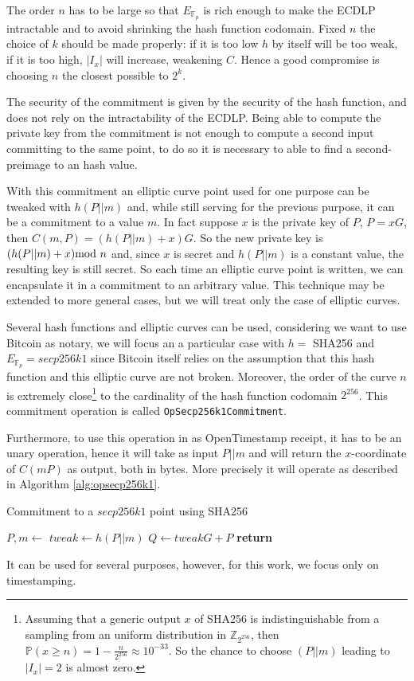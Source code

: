 The order $n$ has to be large so that $E_{\mathbb{F}_p}$ is rich enough to make the ECDLP intractable and to avoid shrinking the hash function codomain. Fixed $n$ the choice of $k$ should be made properly: if it is too low $h$ by itself will be too weak, if it is too high, $|I_x|$ will increase, weakening $C$. Hence a good compromise is choosing $n$ the closest possible to $2^k$.

The security of the commitment is given by the security of the hash function, and does not rely on the intractability of the ECDLP. Being able to compute the private key from the commitment is not enough to compute a second input committing to the same point, to do so it is necessary to able to find a second-preimage to an hash value.

With this commitment an elliptic curve point used for one purpose can be tweaked with $h(P||m)$ and, while still serving for the previous purpose, it can be a commitment to a value $m$. In fact suppose $x$ is the private key of $P$, $P=xG$, then $C(m,P)=(h(P||m)+x)G$. So the new private key is $(h(P||m)+x) \textmd{mod } n$ and, since $x$ is secret and $h(P||m)$ is a constant value, the resulting key is still secret.
So each time an elliptic curve point is written, we can encapsulate it in a commitment to an arbitrary value.
This technique may be extended to more general cases, but we will treat only the case of elliptic curves.

Several hash functions and elliptic curves can be used, considering we want to use Bitcoin as notary, we will focus an a particular case with $h=$ SHA256 and $E_{\mathbb{F}_p}=secp256k1$ since Bitcoin itself relies on the assumption that this hash function and this elliptic curve are not broken.
Moreover, the order of the curve $n$ is extremely close\footnote{Assuming that a generic output $x$ of SHA256 is indistinguishable from a sampling from an uniform distribution in $\mathbb{Z}_{2^{256}}$, then $\mathbb{P}(x\geq n)=1-\frac{n}{2^{256}}\approx 10^{-33}$. So the chance to choose $(P||m)$ leading to $|I_x|=2$ is almost zero.} 
to the cardinality of the hash function codomain $2^{256}$. This commitment operation is called \verb|OpSecp256k1Commitment|.

Furthermore, to use this operation in as OpenTimestamp receipt, it has to be an unary operation, hence it will take as input $P||m$ and will return the $x$-coordinate of $C(m P)$ as output, both in bytes. More precisely it will operate as described in Algorithm \ref{alg:opsecp256k1}.
\begin{algorithm}
	\caption{Commitment to a $secp256k1$ point using SHA256}
	\label{alg:opsecp256k1}
	\begin{algorithmic}[1]
	\State $P,m \gets$ 
	\State $tweak \gets h(P||m)$
	\State $Q \gets tweak G + P$
	\State \textbf{return} 
	\EndProcedure
	\end{algorithmic}
\end{algorithm}
It can be used for several purposes, however, for this work, we focus only on timestamping.

